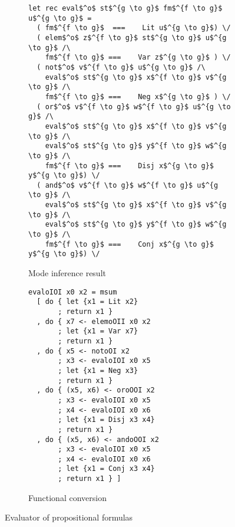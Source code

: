 \begin{figure}[h]
  \centering
  \begin{subfigure}[b]{0.45\textwidth}
    \begin{lstlisting}[frame=tb]
let rec eval$^o$ st$^{g \to g}$ fm$^{f \to g}$ u$^{g \to g}$ =
  ( fm$^{f \to g}$  ===    Lit u$^{g \to g}$) \/
  ( elem$^o$ z$^{f \to g}$ st$^{g \to g}$ u$^{g \to g}$ /\
    fm$^{f \to g}$ ===    Var z$^{g \to g}$ ) \/
  ( not$^o$ v$^{f \to g}$ u$^{g \to g}$ /\
    eval$^o$ st$^{g \to g}$ x$^{f \to g}$ v$^{g \to g}$ /\
    fm$^{f \to g}$ ===    Neg x$^{g \to g}$ ) \/
  ( or$^o$ v$^{f \to g}$ w$^{f \to g}$ u$^{g \to g}$ /\
    eval$^o$ st$^{g \to g}$ x$^{f \to g}$ v$^{g \to g}$ /\
    eval$^o$ st$^{g \to g}$ y$^{f \to g}$ w$^{g \to g}$ /\
    fm$^{f \to g}$ ===    Disj x$^{g \to g}$ y$^{g \to g}$) \/
  ( and$^o$ v$^{f \to g}$ w$^{f \to g}$ u$^{g \to g}$ /\
    eval$^o$ st$^{g \to g}$ x$^{f \to g}$ v$^{g \to g}$ /\
    eval$^o$ st$^{g \to g}$ y$^{f \to g}$ w$^{g \to g}$ /\
    fm$^{f \to g}$ ===    Conj x$^{g \to g}$ y$^{g \to g}$) \/
    \end{lstlisting}
    \caption{Mode inference result}
    \label{fig:prop_modded}
  \end{subfigure}
  \vspace{0.5cm}

  \begin{subfigure}[b]{0.45\textwidth}
    \begin{lstlisting}[frame=tb]
evaloIOI x0 x2 = msum
  [ do { let {x1 = Lit x2}
       ; return x1 }
  , do { x7 <- elemoOII x0 x2
       ; let {x1 = Var x7}
       ; return x1 }
  , do { x5 <- notoOI x2
       ; x3 <- evaloIOI x0 x5
       ; let {x1 = Neg x3}
       ; return x1 }
  , do { (x5, x6) <- oroOOI x2
       ; x3 <- evaloIOI x0 x5
       ; x4 <- evaloIOI x0 x6
       ; let {x1 = Disj x3 x4}
       ; return x1 }
  , do { (x5, x6) <- andoOOI x2
       ; x3 <- evaloIOI x0 x5
       ; x4 <- evaloIOI x0 x6
       ; let {x1 = Conj x3 x4}
       ; return x1 } ]
    \end{lstlisting}
    \caption{Functional conversion}
    \label{fig:prop_hsk}
  \end{subfigure}
  \caption{Evaluator of propositional formulas}
  \label{fig:prop}
\end{figure}
